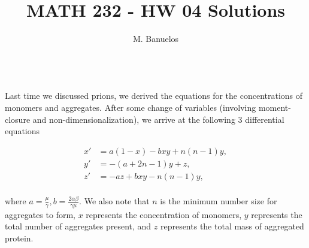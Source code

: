 \documentclass[11pt]{amsart}
\title{MATH 232 - HW 04 Solutions}
\author{M. Banuelos}
\begin{document}
\maketitle


\\

Last time we discussed prions, we derived the equations for the concentrations of monomers and aggregates. After some change of variables (involving moment-closure and non-dimensionalization), we arrive at the following 3 differential equations

\begin{align*} x' &= a(1-x) - bxy + n(n-1)y,\\ 
y' &= -(a+2n-1)y + z,\\ z' &= -az + bxy - n(n-1)y,
\\ 
\end{align*} 


where $a = \frac{\mu}{\gamma}, b = \frac{2 \alpha \beta}{\gamma \mu}$. We also note that $n$ is the minimum number size for aggregates to form, $x$ represents the concentration of monomers, $y$ represents the total number of aggregates present, and $z$ represents the total mass of aggregated protein.
\end{document}
